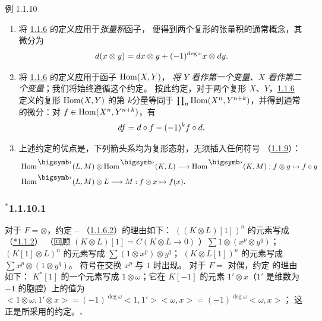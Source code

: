 \begin{enonce*}[remark]{例 1.1.10}
\begin{enumerate}
\renewcommand{\theenumi}{\roman{enumi}}
\renewcommand{\labelenumi}{(\theenumi)}
\item 将 \hyperref[XVII.subsubsec1.1.6]{1.1.6} 的定义应用于\emph{张量积}函子，
  便得到两个复形的张量积的通常概念，其微分为
\[
d(x\otimes y)=dx\otimes y+(-1)^{\deg x}x\otimes dy{}.
\]

\item 将 \hyperref[XVII.subsubsec1.1.6]{1.1.6} 的定义应用于函子 $\operatorname{Hom}(X,Y)$，
  \emph{将 $Y$ 看作第一个变量、$X$ 看作第二个变量}；我们将始终遵循这个约定。
  按此约定，对于两个复形 $X$、$Y$，\hyperref[XVII.subsubsec1.1.6]{1.1.6}
  定义的复形 $\operatorname{Hom}(X,Y)$ 的第 $k$分量等同于
  $\prod_n\operatorname{Hom}(X^{n},Y^{n+k})$，并得到通常的微分：对
  $f\in \operatorname{Hom}(X^{n},Y^{n+k})$，有
\[
df=d\circ f-(-1)^{k}f\circ d{}.
\]

\item 上述约定的优点是，下列箭头系均为复形态射，无须插入任何符号
  \pageoriginale（\hyperref[XVII.subsubsec1.1.9]{1.1.9}）：
\begin{align*}
& \Hom^{\bigdot}(L,M)\otimes \Hom^{\bigdot}(K,L)\longrightarrow
  \Hom^{\bigdot}(K,M):f\otimes g\mapsto f\circ g\\
& \Hom^{\bigdot}(L,M)\otimes L\longrightarrow M: f\otimes x\mapsto f(x){\quoi}.
\end{align*}
\end{enumerate}
\end{enonce*}

\subsubsection*{${}^{\ast}$1.1.10.1}
对于 $F=\otimes$，约定 --
（\hyperref[XVII.par1.1.6.2]{1.1.6.2}）的理由如下：
$((K\otimes L)[1])^{n}$ 的元素写成（\hyperref[XVII.subsubsec*1.1.2]{*1.1.2}）
（回顾 $(K\otimes L)[1]=C(K\otimes L\rightarrow 0)$
）$\sum 1\otimes(x^{p}\otimes y^{q})$；
$(K[1]\otimes L)^{n}$ 的元素写成 $\sum (1\otimes x^{p})\otimes y^{q}$；
$(K\otimes L[1])^{n}$ 的元素写成 $\sum x^{p}\otimes (1\otimes y^{q})$。
符号在交换 $x^{p}$ 与 $1$ 时出现。
对于 $F=$ 对偶，约定  的理由如下：
$K^{\ast}[1]$ 的一个元素写成 $1\otimes \omega$；它在 $K[-1]$ 的元素
$1'\otimes x$（$1'$ 是维数为 $-1$ 的胞腔）上的值为
$<1\otimes \omega, 1'\otimes x>=(-1)^{\deg\omega}<1, 1'><\omega,x>=(-1)^{\deg\omega}<\omega,x>$；
这正是所采用的约定。${}_{\ast}$

